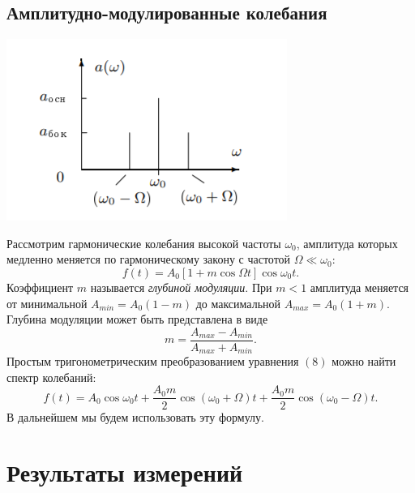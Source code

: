 \subsection*{Амплитудно-модулированные колебания}
\begin{center}
\includegraphics[scale=0.9]{4.png}
\end{center}
Рассмотрим гармонические колебания высокой частоты $\omega_0$, амплитуда которых медленно меняется по гармоническому закону с частотой $\Omega \ll \omega_0$:
\begin{equation}
f(t) = A_0 \left[1+m\cos \Omega t\right] \cos \omega_0 t.
\end{equation}
Коэффициент $m$ называется \textit{глубиной модуляции}. При $m < 1$ амплитуда меняется от минимальной $A_{min} = A_0(1-m)$ до максимальной $A_{max} = A_0(1+m)$. Глубина модуляции может быть представлена в виде
\begin{equation}
m = \dfrac{A_{max}-A_{min}}{A_{max}+A_{min}}.
\end{equation}
Простым тригонометрическим преобразованием уравнения $(8)$ можно найти спектр колебаний:
\begin{equation}
f(t) = A_0 \cos \omega_0t + \dfrac{A_0m}{2} \cos \left(\omega_0 + \Omega\right)t + \dfrac{A_0m}{2}\cos\left(\omega_0 - \Omega\right)t.
\end{equation}
\n
В дальнейшем мы будем использовать эту формулу.

\section*{Результаты измерений}

